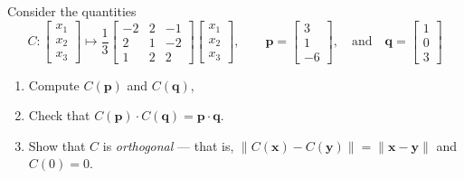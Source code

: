 \documentclass[12 pt, letterpaper]{hmcpset}
\begin{document}
\begin{problem}[Problem 2.]
	Consider the quantities
	\[
		C : \begin{bmatrix}
			x_{1} \\
			x_{2} \\
			x_{3}
		\end{bmatrix} \mapsto
		\frac{1}{3}
		\begin{bmatrix}
			-2 & 2 & -1 \\
			2 & 1 & -2 \\
			1 & 2 & 2
		\end{bmatrix}
		\begin{bmatrix}
			x_{1} \\
			x_{2} \\
			x_{3}
		\end{bmatrix}, \quad \quad
		\mathbf{p} = \begin{bmatrix}
			3 \\
			1 \\
			-6
		\end{bmatrix}, \quad \text{and} \quad
		\mathbf{q} = \begin{bmatrix}
			1 \\
			0 \\
			3
		\end{bmatrix}
	\]
	\begin{enumerate}
		\item Compute $C(\mathbf{p})$ and $C(\mathbf{q})$,
		\item Check that $C(\mathbf{p}) \cdot C(\mathbf{q}) = \mathbf{p} \cdot \mathbf{q}$.
		\item Show that $C$ is \textit{orthogonal} --- that is, $\lVert C(\mathbf{x}) - C(\mathbf{y}) \rVert = \lVert \mathbf{x} - \mathbf{y} \rVert$ and $C(0) = 0$.
	\end{enumerate}
\end{problem}
\end{document}
